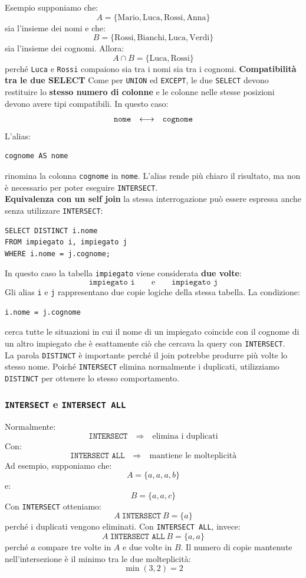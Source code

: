 \textcolor{verdeEsempio}{Esempio} supponiamo che:
\[
A =
\{\text{Mario},\text{Luca},\text{Rossi},\text{Anna}\}
\]
sia l'insieme dei nomi e che:
\[
B =
\{\text{Rossi},\text{Bianchi},\text{Luca},\text{Verdi}\}
\]
sia l'insieme dei cognomi.
Allora:
\[
A \cap B =
\{\text{Luca},\text{Rossi}\}
\]
perché \texttt{Luca} e \texttt{Rossi} compaiono sia tra i nomi
sia tra i cognomi.
\textbf{Compatibilità tra le due SELECT}
Come per \texttt{UNION} ed \texttt{EXCEPT}, le due \texttt{SELECT}
devono restituire lo \textbf{stesso numero di colonne} e le colonne
nelle stesse posizioni devono avere tipi compatibili.
In questo caso:
\[
\begin{array}{ccc}
\text{\texttt{nome}} & \longleftrightarrow &
\text{\texttt{cognome}}
\end{array}
\]
L'alias:
\begin{verbatim}
cognome AS nome
\end{verbatim}
rinomina la colonna \texttt{cognome} in \texttt{nome}.
L'alias rende più chiaro il risultato, ma non è necessario
per poter eseguire \texttt{INTERSECT}.\\
\textbf{Equivalenza con un self join} la stessa interrogazione può essere espressa
anche senza utilizzare \texttt{INTERSECT}:
\begin{verbatim}
SELECT DISTINCT i.nome
FROM impiegato i, impiegato j
WHERE i.nome = j.cognome;
\end{verbatim}
\noindent In questo caso la tabella \texttt{impiegato} viene considerata
\textbf{due volte}:
\[
\texttt{impiegato i}
\qquad\text{e}\qquad
\texttt{impiegato j}
\]
Gli alias \texttt{i} e \texttt{j} rappresentano due copie logiche
della stessa tabella.
La condizione:
\begin{verbatim}
i.nome = j.cognome
\end{verbatim}
\noindent cerca tutte le situazioni in cui il nome di un impiegato coincide
con il cognome di un altro impiegato
che è esattamente ciò che cercava la query con \texttt{INTERSECT}.\\
La parola \texttt{DISTINCT} è importante perché il join potrebbe
produrre più volte lo stesso nome. Poiché \texttt{INTERSECT}
elimina normalmente i duplicati, utilizziamo \texttt{DISTINCT}
per ottenere lo stesso comportamento.
\subsubsection*{\texttt{INTERSECT} e \texttt{INTERSECT ALL}}
Normalmente:
\[
\boxed{
\texttt{INTERSECT}
\quad\Rightarrow\quad
\text{elimina i duplicati}
}
\]
Con:
\[
\boxed{
\texttt{INTERSECT ALL}
\quad\Rightarrow\quad
\text{mantiene le molteplicità}
}
\]
Ad esempio, supponiamo che:
\[
A = \{a,a,a,b\}
\]
e:
\[
B = \{a,a,c\}
\]
Con \texttt{INTERSECT} otteniamo:
\[
A \ \texttt{INTERSECT} \ B = \{a\}
\]
perché i duplicati vengono eliminati.
Con \texttt{INTERSECT ALL}, invece:
\[
A \ \texttt{INTERSECT ALL} \ B = \{a,a\}
\]
perché $a$ compare tre volte in $A$ e due volte in $B$.
Il numero di copie mantenute nell'intersezione è il minimo
tra le due molteplicità:
\[
\min(3,2)=2
\]

